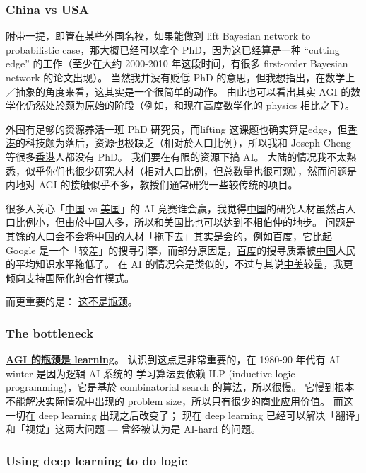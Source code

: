 \documentclass[orivec]{llncs}
\begin{document}
\subsubsection{China vs USA}

附带一提，即管在某些外国名校，如果能做到 lift Bayesian network to probabilistic case，那大概已经可以拿个 PhD，因为这已经算是一种 ``cutting edge'' 的工作（至少在大约 2000-2010 年这段时间，有很多 first-order Bayesian network 的论文出现）。 当然我并没有贬低 PhD 的意思，但我想指出，在数学上／抽象的角度来看，这其实是一个很简单的动作。  由此也可以看出其实 AGI 的数学化仍然处於颇为原始的阶段（例如，和现在高度数学化的 physics 相比之下）。

外国有足够的资源养活一班 PhD 研究员，而lifting 这课题也确实算是edge，但\uline{香港}的科技颇为落后，资源也极缺乏（相对於人口比例），所以我和 Joseph Cheng 等很多\uline{香港}人都没有 PhD。 我们要在有限的资源下搞 AI。  大陆的情况我不太熟悉，似乎你们也很少研究人材（相对人口比例，但总数量也很可观），然而问题是内地对 AGI 的接触似乎不多，教授们通常研究一些较传统的项目。

很多人关心「\uline{中国} vs \uline{美国}」的 AI 竞赛谁会赢，我觉得\uline{中国}的研究人材虽然占人口比例小，但由於\uline{中国}人多，所以和\uline{美国}比也可以达到不相伯仲的地步。  问题是其馀的人口会不会将\uline{中国}的人材「拖下去」其实是会的，例如\uline{百度}，它比起 Google 是一个「较差」的搜寻引擎，而部分原因是，\uline{百度}的搜寻质素被\uline{中国}人民的平均知识水平拖低了。  在 AI 的情况会是类似的，不过与其说\uline{中美}较量，我更倾向支持国际化的合作模式。

而更重要的是：  \uline{这不是瓶颈}。

\subsubsection{The bottleneck}

\underline{\textbf{AGI 的瓶颈是 learning}}。  认识到这点是非常重要的，在 1980-90 年代有 AI winter 是因为逻辑 AI 系统的 学习算法要依赖 ILP (inductive logic programming)，它是基於 combinatorial search 的算法，所以很慢。 它慢到根本不能解决实际情况中出现的 problem size，所以只有很少的商业应用价值。 而这一切在 deep learning 出现之后改变了； 现在 deep learning 已经可以解决「翻译」和「视觉」这两大问题 --- 曾经被认为是 AI-hard 的问题。 

\subsubsection{Using deep learning to do logic}
\end{document}
